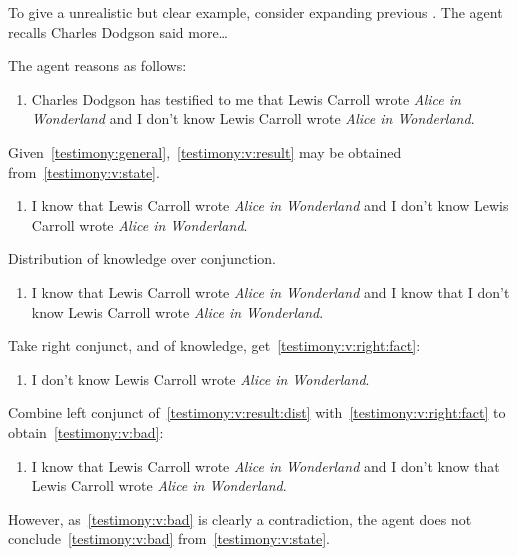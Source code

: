 \begin{note}
  To give a unrealistic but clear example, consider expanding previous .
  The agent recalls Charles Dodgson said more\dots

  \begin{illustration}
    The agent reasons as follows:
    \begin{enumerate}[label=\arabic*\('\)., ref=(\arabic*\('\))]
    \item
      \label{testimony:v:state}
      Charles Dodgson has testified to me that Lewis Carroll wrote \emph{Alice in Wonderland} and I don't know Lewis Carroll wrote \emph{Alice in Wonderland}.
    \end{enumerate}

    Given~\ref{testimony:general},~\ref{testimony:v:result} may be obtained from~\ref{testimony:v:state}.

    \begin{enumerate}[label=\arabic*\('\)., ref=(\arabic*\('\)), resume]
    \item
      \label{testimony:v:result}
      I know that Lewis Carroll wrote \emph{Alice in Wonderland} and I don't know Lewis Carroll wrote \emph{Alice in Wonderland}.
    \end{enumerate}

    Distribution of knowledge over conjunction.

    \begin{enumerate}[label=\arabic*\('\)., ref=(\arabic*\('\)), resume]
    \item
      \label{testimony:v:result:dist}
      I know that Lewis Carroll wrote \emph{Alice in Wonderland} and I know that I don't know Lewis Carroll wrote \emph{Alice in Wonderland}.
    \end{enumerate}

    Take right conjunct, and \factivity{} of knowledge, get~\ref{testimony:v:right:fact}:

    \begin{enumerate}[label=\arabic*\('\)., ref=(\arabic*\('\)), resume]
    \item
      \label{testimony:v:right:fact}
      I don't know Lewis Carroll wrote \emph{Alice in Wonderland}.
    \end{enumerate}

    Combine left conjunct of~\ref{testimony:v:result:dist} with~\ref{testimony:v:right:fact} to obtain~\ref{testimony:v:bad}:

    \begin{enumerate}[label=\arabic*\('\)., ref=(\arabic*\('\)), resume]
    \item
      \label{testimony:v:bad}
      I know that Lewis Carroll wrote \emph{Alice in Wonderland} and I don't know that Lewis Carroll wrote \emph{Alice in Wonderland}.
    \end{enumerate}
    However, as~\ref{testimony:v:bad} is clearly a contradiction, the agent does not conclude~\ref{testimony:v:bad} from~\ref{testimony:v:state}.
  \end{illustration}


\end{note}
